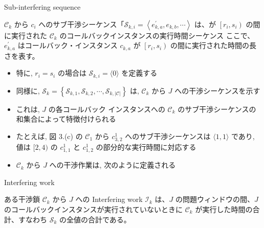 \begin{frame}{Sub-interfering sequence}
    \begin{definition}
        $\mathcal{C}_{k}$ から $c_{i}$ へのサブ干渉シーケンス「$\mathcal{S}_{k, i}=\left\langle e_{k, a}^{\prime}, e_{k, b}, \cdots\right\rangle$ は、が $\left[r_{i}, s_{i}\right)$ の間に実行された $\mathcal{C}_{k}$ のコールバックインスタンスの実行時間シーケンス
        ここで、$e_{k, a}^{\prime}$ はコールバック・インスタンス $c_{k, a}$ が $\left[r_{i}, s_{i}\right)$ の間に実行された時間の長さを表す。
    \end{definition}
\end{frame}

\begin{frame}{}
    \begin{itemize}
        \item 特に, $r_{i}=s_{i}$ の場合は $\mathcal{S}_{k, i}=\langle 0\rangle$ を定義する
        \item 同様に, $\mathcal{S}_{k}=\left\{\mathcal{S}_{k, 1}, \mathcal{S}_{k, 2}, \cdots, \mathcal{S}_{k,|\mathcal{C}|}\right\}$ は, $\mathcal{C}_{k}$ から $J$ への干渉シーケンスを示す
        \item これは, $J$ の各コールバック インスタンスへの $\mathcal{C}_{k}$ のサブ干渉シーケンスの和集合によって特徴付けられる
        \item たとえば, 図 3.(c) の $\mathcal{C}_{1}$ から $c_{3,2}^{1}$ へのサブ干渉シーケンスは $\langle 1,1\rangle$ であり, 値は $[2,4)$ の $c_{1,1}^{1}$ と $c_{1,2}^{1}$ の部分的な実行時間に対応する
        \item $\mathcal{C}_{k}$ から $J$ への干渉作業は, 次のように定義される
    \end{itemize}
\end{frame}

\begin{frame}{Interfering work}
    \begin{definition}
        ある干渉鎖 $\mathcal{C}_{k}$ から $J$ への Interfering work $\mathcal{I}_{k}$ は、$J$ の問題ウィンドウの間、$J$ のコールバックインスタンスが実行されていないときに $\mathcal{C}_{k}$ が実行した時間の合計、すなわち $\mathcal{S}_{k}$ の全値の合計である。
    \end{definition}
\end{frame}

\begin{frame}{}
    \todo{}
\end{frame}

